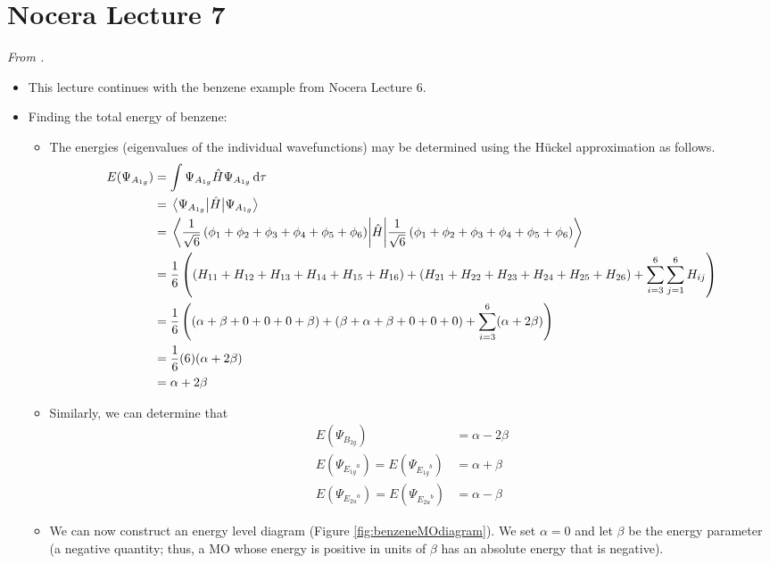 \documentclass[../notes.tex]{subfiles}
\begin{document}
\section{Nocera Lecture 7}
\emph{From \textcite{bib:NoceraLectures}.}
\begin{itemize}
    \item This lecture continues with the benzene example from Nocera Lecture 6.
    \item Finding the total energy of benzene:
    \begin{itemize}
        \item The energies (eigenvalues of the individual wavefunctions) may be determined using the H\"{u}ckel approximation as follows.
        \begin{align*}
            E(\Psi_{A_{1g}}) &= \int\Psi_{A_{1g}}\hat{H}\Psi_{A_{1g}}\dd{\tau}\\
            &= \ev{\hat{H}}{\Psi_{A_{1g}}}\\
            &= \ev{\hat{H}}{\frac{1}{\sqrt{6}}\left( \phi_1+\phi_2+\phi_3+\phi_4+\phi_5+\phi_6 \right)}\\
            &= \frac{1}{6}\left( \left( H_{11}+H_{12}+H_{13}+H_{14}+H_{15}+H_{16} \right)+\left( H_{21}+H_{22}+H_{23}+H_{24}+H_{25}+H_{26} \right)+\sum_{i=3}^6\sum_{j=1}^6H_{ij} \right)\\
            &= \frac{1}{6}\left( \left( \alpha+\beta+0+0+0+\beta \right)+\left( \beta+\alpha+\beta+0+0+0 \right)+\sum_{i=3}^6(\alpha+2\beta) \right)\\
            &= \frac{1}{6}(6)(\alpha+2\beta)\\
            &= \alpha+2\beta
        \end{align*}
        \item Similarly, we can determine that
        \begin{align*}
            E(\Psi_{B_{2g}}) &= \alpha-2\beta\\
            E(\Psi_{{E_{1g}}^a}) = E(\Psi_{{E_{1g}}^b}) &= \alpha+\beta\\
            E(\Psi_{{E_{2u}}^a}) = E(\Psi_{{E_{2u}}^b}) &= \alpha-\beta
        \end{align*}
        \item We can now construct an energy level diagram (Figure \ref{fig:benzeneMOdiagram}). We set $\alpha=0$ and let $\beta$ be the energy parameter (a negative quantity; thus, a MO whose energy is positive in units of $\beta$ has an absolute energy that is negative).
        \begin{figure}[h!]
            \centering
\end{figure}
\end{itemize}
\end{itemize}
\end{document}

